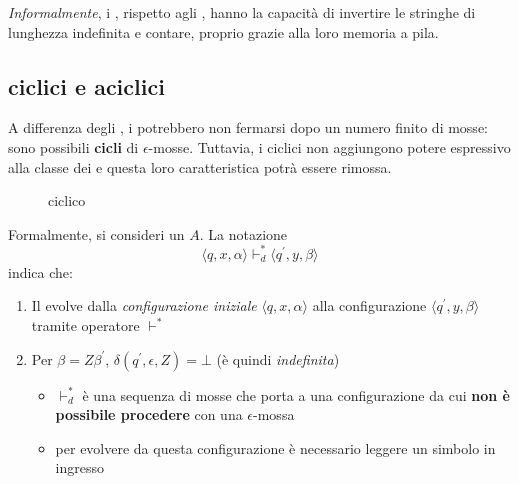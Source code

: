 \documentclass[italian, 10pt]{article}
\begin{document}
\textit{Informalmente}, i \PDA, rispetto agli \FSA, hanno la capacità di invertire le stringhe di lunghezza indefinita e contare, proprio grazie alla loro memoria a pila.

\subsection{\PDA ciclici e aciclici}

A differenza degli \FSA, i \PDA potrebbero non fermarsi dopo un numero finito di mosse: sono possibili \textbf{cicli} di \(\epsilon\)-mosse.
Tuttavia, i \PDA ciclici non aggiungono potere espressivo alla classe dei \PDA e questa loro caratteristica potrà essere rimossa.

\begin{figure}[htbp]
  \bigskip
  \centering

  \caption{\PDA ciclico}
  \label{fig:PDA-ciclo}
  \bigskip
\end{figure}

Formalmente, si consideri un \PDA \(A\).
La notazione
\[ \langle q, x, \alpha \rangle \vdash^\ast_d \langle q^\prime , y, \beta \rangle\]
indica che:

\begin{enumerate}
  \item Il \PDA evolve dalla \textit{configurazione iniziale} \(\langle q, x, \alpha \rangle\) alla configurazione \(\langle q^\prime , y, \beta \rangle\) tramite operatore \(\vdash^\ast\)
  \item Per \(\beta = Z \beta^\prime\), \(\delta(q^\prime , \epsilon, Z) = \bot\) (è quindi \textit{indefinita})
        \begin{itemize}
          \item \(\vdash^\ast_d\) è una sequenza di mosse che porta a una configurazione da cui \textbf{non è possibile procedere} con una \(\epsilon\)-mossa
          \item per evolvere da questa configurazione è necessario leggere un simbolo in ingresso
        \end{itemize}
\end{enumerate}
\end{document}
